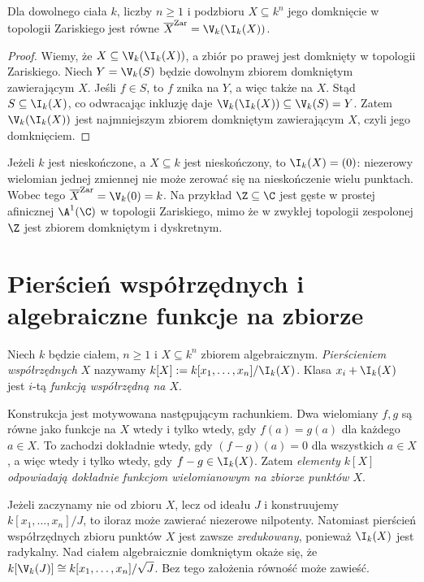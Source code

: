 \begin{stwierdzenie}
\label{st:closure}
Dla dowolnego ciała $k$, liczby $n\ge1$ i podzbioru
$X\subseteq k^n$ jego domknięcie w topologii Zariskiego jest równe
$\overline X^{\mathrm{Zar}}=\V_k(\I_k(X))$.
\end{stwierdzenie}
\begin{proof}
Wiemy, że $X\subseteq\V_k(\I_k(X))$, a zbiór po prawej
jest domknięty w topologii Zariskiego.
Niech $Y=\V_k(S)$ będzie dowolnym zbiorem domkniętym zawierającym $X$.
Jeśli $f\in S$, to $f$ znika na $Y$, a więc także na $X$.
Stąd $S\subseteq\I_k(X)$, co odwracając inkluzję daje
$\V_k(\I_k(X))\subseteq\V_k(S)=Y$.
Zatem $\V_k(\I_k(X))$ jest najmniejszym zbiorem domkniętym
zawierającym $X$, czyli jego domknięciem.
\end{proof}

\begin{przyklad}
Jeżeli $k$ jest nieskończone, a $X\subseteq k$ jest nieskończony,
to $\I_k(X)=(0)$: niezerowy wielomian jednej zmiennej nie może
zerować się na nieskończenie wielu punktach.
Wobec tego $\overline X^{\mathrm{Zar}}=\V_k(0)=k$.
Na przykład $\Z\subseteq\C$ jest gęste w prostej afinicznej
$\A^1(\C)$ w topologii Zariskiego, mimo że w zwykłej topologii
zespolonej $\Z$ jest zbiorem domkniętym i dyskretnym.
\end{przyklad}

\section{Pierścień współrzędnych i algebraiczne funkcje na zbiorze}

\begin{definicja}
Niech $k$ będzie ciałem, $n\ge1$ i $X\subseteq k^n$ zbiorem
algebraicznym. \emph{Pierścieniem współrzędnych} $X$ nazywamy
$k[X]:=k[x_1,\dots,x_n]/\I_k(X)$.
Klasa $x_i+\I_k(X)$ jest $i$-tą \emph{funkcją współrzędną na $X$}.
\end{definicja}

Konstrukcja jest motywowana następującym rachunkiem. Dwa wielomiany
$f,g$ są równe jako funkcje na $X$ wtedy i tylko wtedy, gdy
$f(a)=g(a)$ dla każdego $a\in X$. To zachodzi dokładnie wtedy,
gdy $(f-g)(a)=0$ dla wszystkich $a\in X$, a więc wtedy i tylko wtedy,
gdy $f-g\in\I_k(X)$. Zatem \emph{elementy $k[X]$ odpowiadają dokładnie
funkcjom wielomianowym na zbiorze punktów $X$}.

\begin{uwaga}
Jeżeli zaczynamy nie od zbioru $X$, lecz od ideału $J$ i konstruujemy
$k[x_1,\dots,x_n]/J$, to iloraz może zawierać niezerowe nilpotenty.
Natomiast pierścień współrzędnych zbioru punktów $X$ jest zawsze
\emph{zredukowany}, ponieważ $\I_k(X)$ jest radykalny.
Nad ciałem algebraicznie domkniętym okaże się, że
$k[\V_k(J)]\cong k[x_1,\dots,x_n]/\sqrt J$.
Bez tego założenia równość może zawieść.
\end{uwaga}


